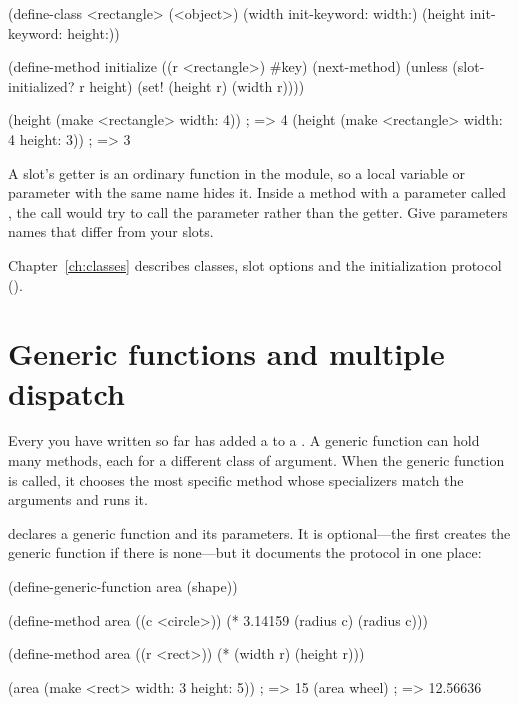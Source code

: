 \begin{dylan}
(define-class <rectangle> (<object>)
  (width  init-keyword: width:)
  (height init-keyword: height:))

(define-method initialize ((r <rectangle>) #key)
  (next-method)
  (unless (slot-initialized? r height)
    (set! (height r) (width r))))

(height (make <rectangle> width: 4))             ; => 4
(height (make <rectangle> width: 4 height: 3))   ; => 3
\end{dylan}

\begin{warnbox}
A slot's getter is an ordinary function in the module, so a local
variable or parameter with the same name hides it. Inside a method with a
parameter called , the call  would try to call
the parameter rather than the getter. Give parameters names that differ
from your slots.
\end{warnbox}

Chapter~\ref{ch:classes} describes classes, slot options and the
initialization protocol ().

\section{Generic functions and multiple dispatch}\label{sec:tut-generic}

Every  you have written so far has added a
 to a . A generic function can hold
many methods, each for a different class of argument. When the generic
function is called, it chooses the most specific method whose
specializers match the arguments and runs it.

 declares a generic function and its
parameters. It is optional---the first  creates the
generic function if there is none---but it documents the protocol in one
place:

\begin{dylan}
(define-generic-function area (shape))

(define-method area ((c <circle>))
  (* 3.14159 (radius c) (radius c)))

(define-method area ((r <rect>))
  (* (width r) (height r)))

(area (make <rect> width: 3 height: 5))     ; => 15
(area wheel)                                ; => 12.56636
\end{dylan}

